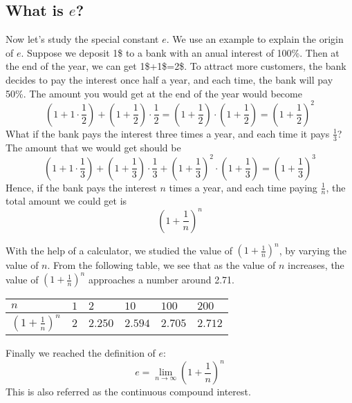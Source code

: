 \documentclass[11pt, oneside]{article}   	%
\begin{document}
\subsection{What is $e$?}
Now let's study the special constant $e$. We use an example to explain the origin of $e$. Suppose we deposit 1\$ to a bank with an anual interest of 100\%. Then at the end of the year, we can get 1\$+1\$=2\$. To attract more customers, the bank decides to pay the interest once half a year, and each time, the bank will pay 50\%. The amount you would get at the end of the year would become 
\[\left(1+1\cdot \frac{1}{2}\right)+\left(1+\frac{1}{2}\right)\cdot \frac{1}{2}=\left(1+\frac{1}{2}\right) \cdot \left(1+\frac{1}{2}\right)=\left(1+\frac{1}{2}\right)^2\]
What if the bank pays the interest three times a year, and each time it pays $\frac{1}{3}$? The amount that we would get should be
\[\left(1+1\cdot \frac{1}{3}\right)+\left(1+\frac{1}{3}\right)\cdot \frac{1}{3}+\left(1+\frac{1}{3}\right)^2 \cdot \left(1+\frac{1}{3}\right)=\left(1+\frac{1}{3}\right)^3\]
Hence, if the bank pays the interest $n$ times a year, and each time paying $\frac{1}{n}$, the total amount we could get is \[\left(1+\frac{1}{n}\right)^n\]

With the help of a calculator, we studied the value of $\left(1+\frac{1}{n}\right)^n$, by varying the value of $n$. From the following table, we see that as the value of $n$ increases, the value of $\left(1+\frac{1}{n}\right)^n$ approaches a number around 2.71. 
\begin{center}
\begin{tabular}{|>{\centering}p{1.5cm}|>{\centering}p{1cm}|>{\centering}p{1cm}|>{\centering}p{1cm}|>{\centering}p{1cm}|>{\centering\arraybackslash}p{1cm}|}
\hline
$n$ & $1$ & $2$ & $10$ & $100$ & $200$\\
\hline
$\left(1+\frac{1}{n}\right)^n$ & $2$ & $2.250$ & $2.594$ & $2.705$ & $2.712$\\
\hline
\end{tabular}
\end{center}

Finally we reached the definition of $e$:
\[e=\lim_{n\rightarrow \infty}\left(1+\frac{1}{n}\right)^n\]
This is also referred as the continuous compound interest. 
\end{document}

